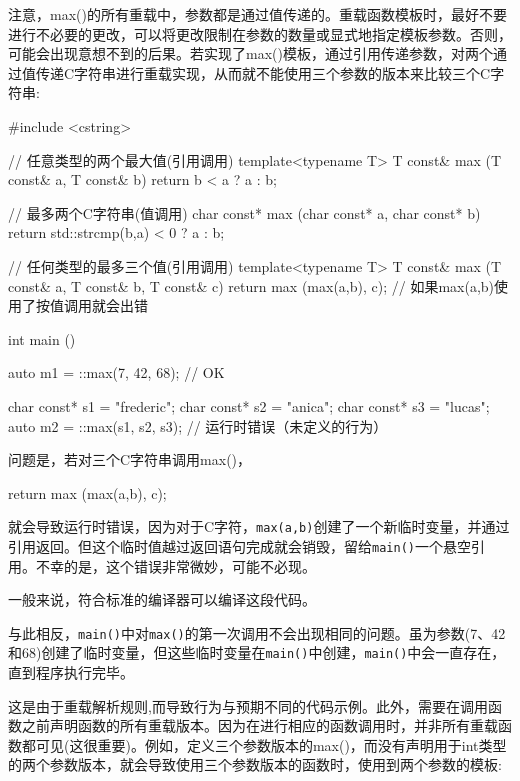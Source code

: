 注意，max()的所有重载中，参数都是通过值传递的。重载函数模板时，最好不要进行不必要的更改，可以将更改限制在参数的数量或显式地指定模板参数。否则，可能会出现意想不到的后果。若实现了max()模板，通过引用传递参数，对两个通过值传递C字符串进行重载实现，从而就不能使用三个参数的版本来比较三个C字符串:

\begin{cpp}
#include <cstring>

// 任意类型的两个最大值(引用调用)
template<typename T>
T const& max (T const& a, T const& b)
{
	return b < a ? a : b;
}

// 最多两个C字符串(值调用)
char const* max (char const* a, char const* b)
{
	return std::strcmp(b,a) < 0 ? a : b;
}

// 任何类型的最多三个值(引用调用)
template<typename T>
T const& max (T const& a, T const& b, T const& c)
{
	return max (max(a,b), c); // 如果max(a,b)使用了按值调用就会出错
}

int main ()
{
	auto m1 = ::max(7, 42, 68); // OK
	
	char const* s1 = "frederic";
	char const* s2 = "anica";
	char const* s3 = "lucas";
	auto m2 = ::max(s1, s2, s3); // 运行时错误（未定义的行为）
}
\end{cpp}

问题是，若对三个C字符串调用max()，

\begin{cpp}
return max (max(a,b), c);
\end{cpp}

就会导致运行时错误，因为对于C字符，\texttt{max(a,b)}创建了一个新临时变量，并通过引用返回。但这个临时值越过返回语句完成就会销毁，留给\texttt{main()}一个悬空引用。不幸的是，这个错误非常微妙，可能不必现。

\begin{notice}一般来说，符合标准的编译器可以编译这段代码。
\end{notice}

与此相反，\texttt{main()}中对\texttt{max()}的第一次调用不会出现相同的问题。虽为参数(7、42和68)创建了临时变量，但这些临时变量在\texttt{main()}中创建，\texttt{main()}中会一直存在，直到程序执行完毕。

这是由于重载解析规则,而导致行为与预期不同的代码示例。此外，需要在调用函数之前声明函数的所有重载版本。因为在进行相应的函数调用时，并非所有重载函数都可见(这很重要)。例如，定义三个参数版本的max()，而没有声明用于int类型的两个参数版本，就会导致使用三个参数版本的函数时，使用到两个参数的模板:

